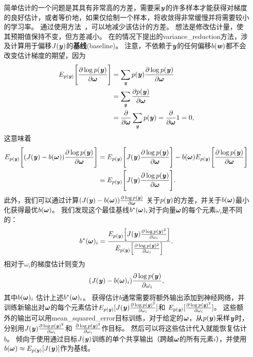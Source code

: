简单估计的一个问题是其具有非常高的方差，需要采$\Vy$的许多样本才能获得对梯度的良好估计，或者等价地，如果仅绘制一个样本，将收敛得非常缓慢并将需要较小的学习率。
通过使用方法~\citep{Wilson-1984,LEcuyer-1994}，可以地减少该估计的方差。
想法是修改估计量，使其预期值保持不变，但方差减小。
在的情况下提出的\gls{variance_reduction}方法，涉及计算用于偏移$J(\Vy)$的\textbf{基线}(baseline)。
注意，不依赖于$\Vy$的任何偏移$b(\Vw)$都不会改变估计梯度的期望，因为
\begin{align}
 E_{p(\Vy)} \Bigg[ \frac{\partial\log p(\Vy)}{\partial \Vomega}  \Bigg] &=
 \sum_{\Vy} p(\Vy) \frac{\partial\log p(\Vy)}{\partial \Vomega} \\
 &= \sum_{\Vy} \frac{\partial p(\Vy)}{\partial \Vomega} \\
 &= \frac{\partial}{\partial \Vomega} \sum_{\Vy} p(\Vy) = 
 \frac{\partial}{\partial \Vomega} 1 = 0,
\end{align}
这意味着
\begin{align}
 E_{p(\Vy)} \Bigg[ (J(\Vy) - b(\Vomega))\frac{\partial\log p(\Vy)}{\partial \Vomega}  \Bigg] &= 
 E_{p(\Vy)} \Bigg[ J(\Vy) \frac{\partial\log p(\Vy)}{\partial \Vomega} \Bigg]
 - b(\Vomega) E_{p(\Vy)} \Bigg[ \frac{\partial\log p(\Vy)}{\partial \Vomega}  \Bigg] \\
 &= E_{p(\Vy)} \Bigg[ J(\Vy) \frac{\partial\log p(\Vy)}{\partial \Vomega} \Bigg] .
\end{align}
此外，我们可以通过计算$(J(\Vy) - b(\Vomega))\frac{\partial\log p(\Vy)}{\partial \Vomega} $
关于$p(\Vy)$的方差，并关于$b(\Vomega)$最小化获得最优$b(\Vomega)$。
我们发现这个最佳基线$b^*(\Vomega)_i$对于向量$\Vomega$的每个元素$\omega_i$是不同的：
\begin{align} \label{eq:est_b}
 b^*(\Vomega)_i = \frac{E_{p(\Vy)} \Big[ J(\Vy)
 \frac{\partial\log p(\Vy)^2}{\partial \omega_i}  \Big]}
{E_{p(\Vy)} \Big[\frac{\partial\log p(\Vy)^2}{\partial \omega_i}\Big] }.
\end{align}
相对于$\omega_i$的梯度估计则变为
\begin{align}
 (J(\Vy) - b(\Vomega)_i)\frac{\partial\log p(\Vy)}{\partial \omega_i},
\end{align}
其中$ b(\Vomega)_i$ 估计上述$ b^*(\Vomega)_i$。
获得估计$b$通常需要将额外输出添加到神经网络，并训练新输出对$\Vomega$的每个元素估计$E_{p(\Vy)} 
[J(\Vy)\frac{\partial\log p(\Vy)^2}{\partial \omega_i}]$和
$E_{p(\Vy)}[\frac{\partial\log p(\Vy)^2}{\partial \omega_i}]$。
这些额外的输出可以用\gls{mean_squared_error}目标训练，对于给定的$\Vomega$，从$p(\Vy)$采样$\Vy$时，分别用$J(\Vy)\frac{\partial\log p(\Vy)^2}{\partial \omega_i}$和 $\frac{\partial\log p(\Vy)^2}{\partial \omega_i}$作目标。
然后可以将这些估计代入就能恢复估计$b$。
\citet{Mnih+Gregor-ICML2014} 倾向于使用通过目标$J(\Vy)$训练的单个共享输出（跨越$\Vomega$的所有元素$i$），并使用$b(\Vomega) \approx E_{p(\Vy)} [J(\Vy)]$作为基线。

